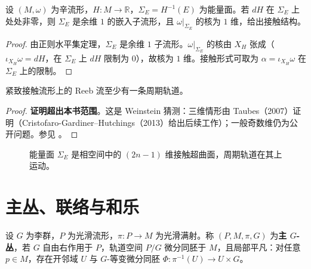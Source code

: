 \begin{proposition}[能量面是接触流形]\label{prop:energy_surface_contact}
设 $(M,\omega)$ 为辛流形，$H:M\to\mathbb{R}$，$\Sigma_E=H^{-1}(E)$ 为能量面。若 $dH$ 在 $\Sigma_E$ 上处处非零，则 $\Sigma_E$ 是余维 $1$ 的嵌入子流形，且 $\omega|_{\Sigma_E}$ 的核为 $1$ 维，给出接触结构。
\end{proposition}

\begin{proof}
由正则水平集定理，$\Sigma_E$ 是余维 $1$ 子流形。$\omega|_{\Sigma_E}$ 的核由 $X_H$ 张成（$\iota_{X_H}\omega=dH$，在 $\Sigma_E$ 上 $dH$ 限制为 $0$），故核为 $1$ 维。接触形式可取为 $\alpha=\iota_{X_H}\omega$ 在 $\Sigma_E$ 上的限制。
\end{proof}

\begin{theorem}\label{thm:weinstein}
紧致接触流形上的 Reeb 流至少有一条周期轨道。
\end{theorem}

\begin{proof}
\textbf{证明超出本书范围}。这是 Weinstein 猜测：三维情形由 Taubes（2007）证明（Cristofaro-Gardiner--Hutchings（2013）给出后续工作）；一般奇数维仍为公开问题。参见 \cite{weinstein1978}。
\end{proof}

\begin{figure}[htbp]
\centering
{}
\caption{能量面 $\Sigma_E$ 是相空间中的 $(2n-1)$ 维接触超曲面，周期轨道在其上运动。}
\label{fig:energy_surface_periodic}
\end{figure}

\section{主丛、联络与和乐}\label{sec:principal_bundle_holonomy}

\begin{definition}[主丛]\label{def:principal_bundle}
设 $G$ 为李群，$P$ 为光滑流形，$\pi:P\to M$ 为光滑满射。称 $(P,M,\pi,G)$ 为\textbf{主 $G$-丛}，若 $G$ 自由右作用于 $P$，轨道空间 $P/G$ 微分同胚于 $M$，且局部平凡：对任意 $p\in M$，存在开邻域 $U$ 与 $G$-等变微分同胚 $\Phi:\pi^{-1}(U)\to U\times G$。
\end{definition}

